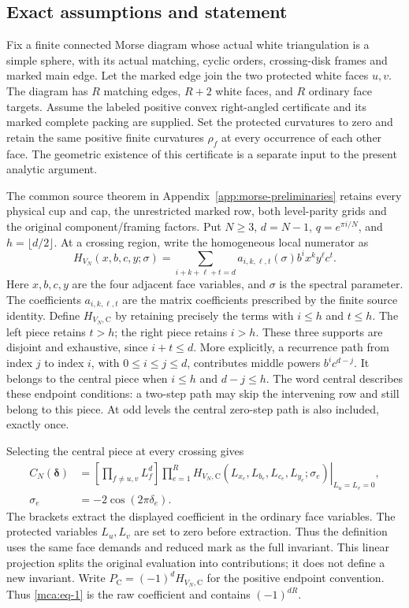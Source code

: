 \subsection{Exact assumptions and statement}\label{mca:sec-1}

Fix a finite connected Morse diagram whose actual white triangulation is
a simple sphere, with its actual matching, cyclic orders, crossing-disk
frames and marked main edge. Let the marked edge join the two protected
white faces \(u,v\). The diagram has \(R\) matching edges, \(R+2\) white
faces, and \(R\) ordinary face targets. Assume the labeled positive
convex right-angled certificate and its marked complete packing are
supplied. Set the protected curvatures to zero and retain the same
positive finite curvatures \(\rho_f\) at every occurrence of each other
face. The geometric existence of this certificate is a separate input to
the present analytic argument.

The common source theorem in Appendix~\ref{app:morse-preliminaries}
retains every physical cup and cap, the unrestricted marked row, both
level-parity grids and the original component/framing factors. Put
\(N\ge3\), \(d=N-1\), \(q=e^{\pi i/N}\), and
\(h=\lfloor d/2\rfloor\). At a crossing region, write the homogeneous
local numerator as
\[
 H_{V_N}(x,b,c,y;\sigma)
   =\sum_{i+k+\ell+t=d}
       a_{i,k,\ell,t}(\sigma)b^i x^k y^\ell c^t .
\]
Here \(x,b,c,y\) are the four adjacent face variables, and \(\sigma\)
is the spectral parameter. The coefficients \(a_{i,k,\ell,t}\) are
the matrix coefficients prescribed by the finite source identity.
Define \(H_{V_N,\mathrm C}\) by retaining precisely the terms with
\(i\le h\) and \(t\le h\). The left piece retains \(t>h\); the right
piece retains \(i>h\). These three supports are disjoint and exhaustive,
since \(i+t\le d\). More explicitly, a recurrence path from index
\(j\) to index \(i\), with \(0\le i\le j\le d\), contributes middle
powers \(b^ic^{d-j}\). It belongs to the central piece when
\(i\le h\) and \(d-j\le h\). The word central describes these endpoint
conditions: a two-step path may skip the intervening row and still
belong to this piece. At odd levels the central zero-step path is
also included, exactly once.

Selecting the central piece at every crossing gives
\begin{equation}\label{mca:eq-1}
\begin{split}
 C_N(\boldsymbol\delta)
 &=\left[\prod_{f\ne u,v}L_f^d\right]
       \left.\prod_{e=1}^{R}
       H_{V_N,\mathrm C}(L_{x_e},L_{b_e},L_{c_e},L_{y_e};\sigma_e)
       \right|_{L_u=L_v=0},\\
 \sigma_e&=-2\cos(2\pi\delta_e).
 \end{split}
\end{equation}
The brackets extract the displayed coefficient in the ordinary face
variables. The protected variables \(L_u,L_v\) are set to zero before
extraction. Thus the definition uses the same face demands and reduced
mark as the full invariant. This linear projection splits the original
evaluation into contributions; it does not define a new invariant. Write
\(P_{\mathrm C}=(-1)^dH_{V_N,\mathrm C}\) for the positive endpoint
convention. Thus \eqref{mca:eq-1} is the raw coefficient and contains
\((-1)^{dR}\).

